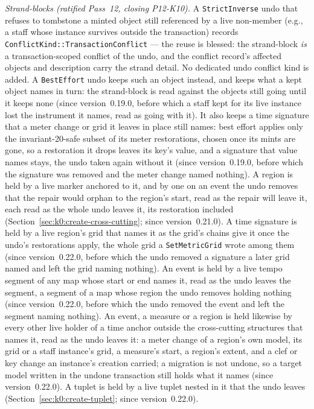 \documentclass[11pt,letterpaper]{report}
\begin{document}
\emph{Strand-blocks (ratified Pass~12, closing P12-K10).} A
\texttt{StrictInverse} undo that refuses to tombstone a minted object still
referenced by a live non-member (e.g., a staff whose instance survives outside
the transaction) records \texttt{ConflictKind::TransactionConflict} --- the
reuse is blessed: the strand-block \emph{is} a transaction-scoped conflict of
the undo, and the conflict record's affected objects and description carry the
strand detail. No dedicated undo conflict kind is added. A
\texttt{BestEffort} undo keeps such an object instead, and keeps what a kept
object names in turn: the strand-block is read against the objects still
going until it keeps none (since version~0.19.0, before which a staff kept for
its live instance lost the instrument it names, read as going with it). It
also keeps a time signature that a meter change or grid it leaves in place
still names: best effort applies only the invariant-20-safe subset of its
meter restorations, chosen once its mints are gone, so a restoration it drops
leaves its key's value, and a signature that value names stays, the undo
taken again without it (since version~0.19.0, before which the signature was
removed and the meter change named nothing). A region is held by a live marker
anchored to it, and by one on an event the undo removes that the repair would
orphan to the region's start, read as the repair will leave it, each read as
the whole undo leaves it, its restoration included
(Section~\ref{sec:k0:create-cross-cutting}; since version~0.21.0). A time
signature is held by a live region's grid that names it as the grid's chains
give it once the undo's restorations apply, the whole grid a
\texttt{SetMetricGrid} wrote among them (since version~0.22.0, before which
the undo removed a signature a later grid named and left the grid naming
nothing). An event is held by a live tempo segment of any map whose start or
end names it, read as the undo leaves the segment, a segment of a map whose
region the undo removes holding nothing (since version~0.22.0, before which
the undo removed the event and left the segment naming nothing). An event, a
measure or a region is held likewise by every other live holder of a time
anchor outside the cross-cutting structures that names it, read as the undo
leaves it: a meter change of a region's own model, its grid or a staff
instance's grid, a measure's start, a region's extent, and a clef or key
change an instance's creation carried; a migration is not undone, so a target
model written in the undone transaction still holds what it names (since
version~0.22.0). A tuplet is held by a live tuplet nested in it that the undo
leaves (Section~\ref{sec:k0:create-tuplet}; since version~0.22.0).
\end{document}
